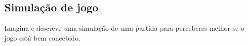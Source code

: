 \subsection{Simulação de jogo}
Imagina e descreve uma simulação de uma partida para perceberes melhor se o jogo está bem concebido.
